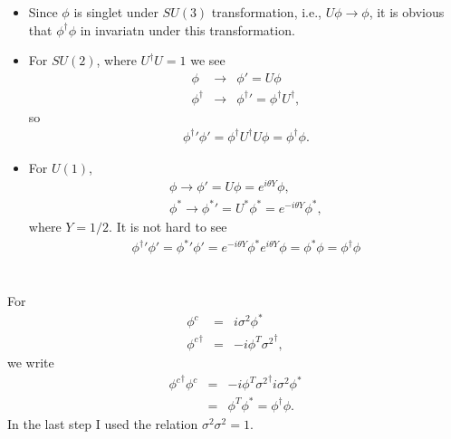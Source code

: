 \documentclass[11pt]{article}
\begin{document}
\section{ }
\begin{itemize}
  \item Since $\phi$ is singlet under $SU(3)$ transformation, i.e., $U \phi \to \phi$, it is obvious that $\phi^\dagger \phi$ in invariatn under this transformation.
  \item For $SU(2)$, where $ U^\dagger U=1$ we see
  \begin{eqnarray}
    \phi & \to & \phi'=U \phi \\
    \phi^\dagger & \to & {\phi^\dagger}'= \phi^\dagger U^\dagger,
  \end{eqnarray}
  so
  \begin{eqnarray}
    {\phi^\dagger}' \phi' = \phi^\dagger U^\dagger U \phi = \phi^\dagger \phi.
  \end{eqnarray}
  \item For $U(1)$,
  \begin{eqnarray}
    \phi \to \phi' = U \phi = e^{i \theta Y} \phi, \\
    \phi^* \to {\phi^*}' = U^* \phi^* = e^{-i \theta Y} \phi^*,
  \end{eqnarray}
  where $Y=1/2$. It is not hard to see
  \begin{eqnarray}
    {\phi^\dagger}' \phi' ={\phi^*}' \phi' = e^{-i \theta Y} \phi^* e^{i \theta Y} \phi = \phi^* \phi= {\phi^\dagger}\phi
  \end{eqnarray}
\end{itemize}

\section{ }
For
\begin{eqnarray}
  \phi^c &=& i \sigma^2 \phi^* \\
  {\phi^c}^\dagger &=& - i  \phi^T {\sigma^2} ^\dagger,
\end{eqnarray}
we write
\begin{eqnarray}
  {\phi^c}^\dagger \phi^c &=&  - i  \phi^T {\sigma^2} ^\dagger i \sigma^2 \phi^* \\
  &=& \phi^T \phi^*= \phi^\dagger \phi.
\end{eqnarray}
In the last step I used the relation $\sigma^2 \sigma^2 =1$.
\end{document}
